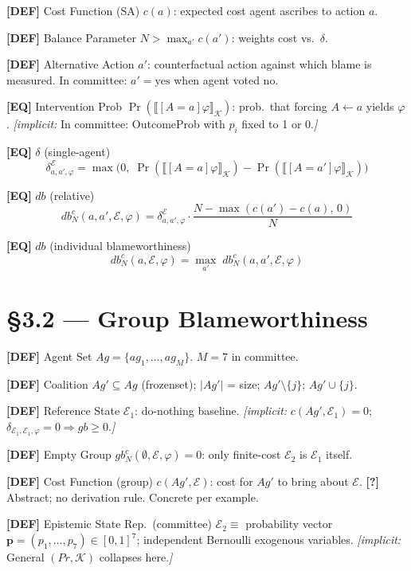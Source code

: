 \documentclass[10pt,a4paper]{article}
\newcommand{\DEF}[1]{\textcolor{defcol}{\textbf{[DEF]}}\; #1}
\newcommand{\EQ}[1]{\textcolor{eqcol}{\textbf{[EQ]}}\; #1}
\newcommand{\AMB}[1]{\textcolor{ambcol}{\textbf{[?]}\; #1}}
\newcommand{\impl}[1]{\textit{[implicit:} #1\textit{]}}
\begin{document}
\DEF{Cost Function (SA)} $c(a)$: expected cost agent ascribes to action $a$.

\DEF{Balance Parameter} $N > \max_{a'} c(a')$: weights cost vs.\ $\delta$.

\DEF{Alternative Action} $a'$: counterfactual action against which blame is measured. In committee: $a' = \text{yes}$ when agent voted no.

\EQ{Intervention Prob} $\Pr(\llbracket[A{=}a]\varphi\rrbracket_\mathcal{K})$: prob.\ that forcing $A \leftarrow a$ yields $\varphi$. \impl{In committee: OutcomeProb with $p_i$ fixed to 1 or 0.}

\EQ{$\delta$ (single-agent)}
$$\delta^{\mathcal{E}}_{a,a',\varphi} = \max\!\bigl(0,\; \Pr(\llbracket[A{=}a]\varphi\rrbracket_\mathcal{K}) - \Pr(\llbracket[A{=}a']\varphi\rrbracket_\mathcal{K})\bigr)$$

\EQ{$db$ (relative)}
$$db^c_N(a,a',\mathcal{E},\varphi) = \delta^{\mathcal{E}}_{a,a',\varphi} \cdot \frac{N - \max(c(a')-c(a),\,0)}{N}$$

\EQ{$db$ (individual blameworthiness)}
$$db^c_N(a,\mathcal{E},\varphi) = \max_{a'}\; db^c_N(a,a',\mathcal{E},\varphi)$$

\section*{\S3.2 — Group Blameworthiness}

\DEF{Agent Set} $Ag = \{ag_1,\ldots,ag_M\}$. $M=7$ in committee.

\DEF{Coalition} $Ag' \subseteq Ag$ (frozenset); $|Ag'|$ = size; $Ag' \setminus \{j\}$; $Ag' \cup \{j\}$.

\DEF{Reference State} $\mathcal{E}_1$: do-nothing baseline. \impl{$c(Ag', \mathcal{E}_1) = 0$; $\delta_{\mathcal{E}_1,\mathcal{E}_1,\varphi} = 0 \Rightarrow gb \geq 0$.}

\DEF{Empty Group} $gb^c_N(\emptyset, \mathcal{E}, \varphi) = 0$: only finite-cost $\mathcal{E}_2$ is $\mathcal{E}_1$ itself.

\DEF{Cost Function (group)} $c(Ag', \mathcal{E})$: cost for $Ag'$ to bring about $\mathcal{E}$. \AMB{Abstract; no derivation rule. Concrete per example.}

\DEF{Epistemic State Rep.\ (committee)} $\mathcal{E}_2 \equiv$ probability vector $\mathbf{p} = (p_1,\ldots,p_7) \in [0,1]^7$; independent Bernoulli exogenous variables. \impl{General $(Pr, \mathcal{K})$ collapses here.}
\end{document}

